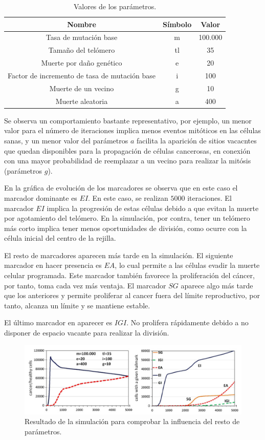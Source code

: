 \begin{table}[h!]
  \centering
  \caption{Valores de los parámetros.}
  \label{tab:table1}
  \begin{tabular}{ccc}
    \toprule
    Nombre & Símbolo & Valor\\
    \midrule
    Tasa de mutación base & m & 100.000\\
    Tamaño del telómero & tl & 35\\
    Muerte por daño genético & e & 20\\
    Factor de incremento de tasa de mutación base & i & 100\\
    Muerte de un vecino & g & 10\\
    Muerte aleatoria & a & 400\\
    \bottomrule
  \end{tabular}
\end{table}

Se observa un comportamiento bastante representativo, por ejemplo, un menor valor
para el número de iteraciones implica menos eventos mitóticos en las células sanas, y
un menor valor del parámetros $a$ facilita la aparición de sitios vacacntes que
quedan disponibles para la propagación de células cancerosas, en conexión con una
mayor probabilidad de reemplazar a un vecino para realizar la mitósis (parámetros $g$).

En la gráfica de evolución de los marcadores se observa que en este caso el marcador
dominante es $EI$. En este caso, se realizan $5000$ iteraciones. El marcador $EI$ implica
la progresión de estas células debido a que evitan la muerte por agotamiento del telómero.
En la simulación, por contra, tener un telómero más corto implica tener menos oportunidades de división, como
ocurre con la célula inicial del centro de la rejilla.

El resto de marcadores aparecen más tarde en la simulación. El siguiente marcador en hacer
presencia es $EA$, lo cual permite a las células evadir la muerte celular programada. Este marcador
también favorece la proliferación del cáncer, por tanto, toma cada vez más ventaja. El marcador
$SG$ aparece algo más tarde que los anteriores y permite proliferar al cancer
fuera del límite reproductivo, por tanto, alcanza un límite y se mantiene estable.

El último marcador en aparecer es $IGI$. No prolifera rápidamente debido a no disponer
de espacio vacante para realizar la división.

\begin{figure}[h]
\centering
\includegraphics[scale=0.8]{figures/experiments/exp4}
\caption{Resultado de la simulación para comprobar la influencia del resto de parámetros.}
\end{figure}

